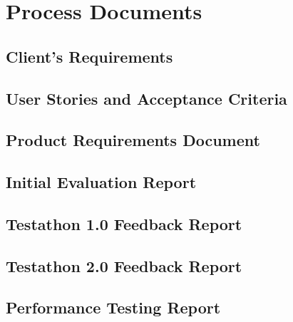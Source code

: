\chapter{Process Documents}

\section{Client's Requirements}
\label{appendix:client_requirements}


\section{User Stories and Acceptance Criteria}
\label{appendix:user_stories}


\section{Product Requirements Document}
\label{appendix:prd}


\section{Initial Evaluation Report}
\label{appendix:initial_evaluation_report}


\section{Testathon 1.0 Feedback Report}
\label{appendix:testathon_report_1}


\section{Testathon 2.0 Feedback Report}
\label{appendix:testathon_report_2}


\section{Performance Testing Report}
\label{appendix:performance-report}

